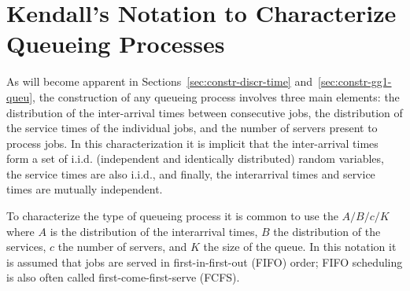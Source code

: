 
\section{Kendall's Notation to Characterize Queueing Processes}
\label{sec:kendalls-notation}

As will become apparent in Sections~\ref{sec:constr-discr-time}
and~\ref{sec:constr-gg1-queu}, the construction of any queueing
process involves three main elements: the distribution of the
inter-arrival times between consecutive jobs, the distribution of the
service times of the individual jobs, and the number of servers
present to process jobs. In this characterization it is implicit that
the inter-arrival times form a set of i.i.d. (independent and
identically distributed) random variables, the service times are also
i.i.d., and finally, the interarrival times and service times are
mutually independent.

To characterize the type of queueing process it is common to use the
 $A/B/c/K$ where $A$ is the distribution of the
interarrival times, $B$ the distribution of the services, $c$ the
number of servers, and $K$ the size of the queue. In this notation it
is assumed that jobs are served in first-in-first-out (FIFO) order;
FIFO scheduling is also often called first-come-first-serve (FCFS).

